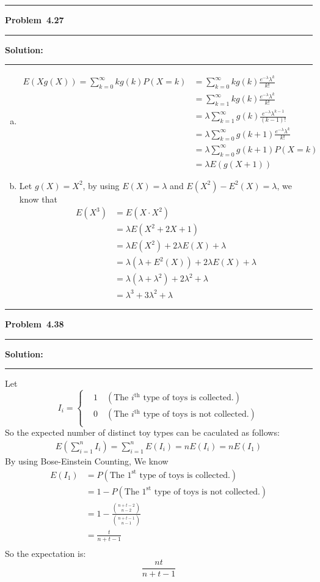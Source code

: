 \documentclass[10.5pt]{article}
\newcommand\question[1]{\vspace{.2in}\hrule\vspace{0.04in}\textbf{Problem\ #1}\vspace{.4em}\hrule\vspace{.10in}}
\newcommand\Solution{\vspace{.3in}\textbf{Solution:}\vspace{.5em}\hrule\vspace{.08in}\par}
\begin{document}
\question{4.27}
	\Solution{}
	\begin{enumerate}[(a)]
		\item \begin{align*}
			E(Xg(X)) = \sum_{k = 0}^{\infty}kg(k)P(X=k) 
			&= \sum_{k = 0}^{\infty}kg(k)\frac{e^{-\lambda}\lambda^k}{k!}\\[6pt]
			&= \sum_{k = 1}^{\infty}kg(k)\frac{e^{-\lambda}\lambda^k}{k!}\\[6pt]
			&= \lambda\sum_{k = 1}^{\infty}g(k)\frac{e^{-\lambda}\lambda^{k-1}}{(k-1)!}\\[6pt]
			&= \lambda\sum_{k = 0}^{\infty}g(k+1)\frac{e^{-\lambda}\lambda^{k}}{k!}\\[6pt]
			&= \lambda\sum_{k = 0}^{\infty}g(k+1)P(X=k)\\[6pt]
			&= \lambda E(g(X+1))
		\end{align*}\vspace{1cm}
		\item Let $g(X) = X^2$, by using $E(X) = \lambda$ and $E(X^2) - E^2(X) = \lambda$, we know that\begin{align*}
		E(X^3)
		&= E(X\cdot X^2)\\[6pt]
		&= \lambda E(X^2+2X+1)\\[6pt]
		&= \lambda E(X^2)+2\lambda E(X)+\lambda\\[6pt]
		&=\lambda(\lambda + E^2(X))+2\lambda E(X)+\lambda\\[6pt]
		& = \lambda(\lambda + \lambda^2)+2\lambda^2+\lambda\\[6pt]
		& =\lambda^3+3\lambda^2+\lambda
		\end{align*}
		
	\end{enumerate}
	
	

\pagebreak

\question{4.38}
\Solution{}
Let \begin{equation*}
	I_i = \begin{cases}
		&1\quad(\text{The $i^{\text{th}}$ type of toys is collected.})\\[6pt]
		&0\quad(\text{The $i^{\text{th}}$ type of toys is not collected.})\\
	\end{cases}
\end{equation*}
So the expected number of distinct toy types can be caculated as follows:
\begin{align*}
	E\left(\sum_{i = 1}^n I_i\right) = \sum_{i = 1}^n E(I_i) = nE(I_i) = nE(I_1)
\end{align*}
By using Bose-Einstein Counting, We know\begin{align*}
	E(I_1) 
	&= P(\text{The $1^{\text{st}}$ type of toys is collected.})\\[6pt]
	&=1- P(\text{The $1^{\text{st}}$ type of toys is not collected.})\\[6pt]
	&=1-\frac{\binom{n + t - 2}{n-2}}{\binom{n + t - 1}{n-1}}\\[6pt]
	&=\frac{t}{n+t-1}\\[12pt]
\end{align*}
So the expectation is: $$\frac{nt}{n+t-1}$$
\pagebreak
\end{document}
